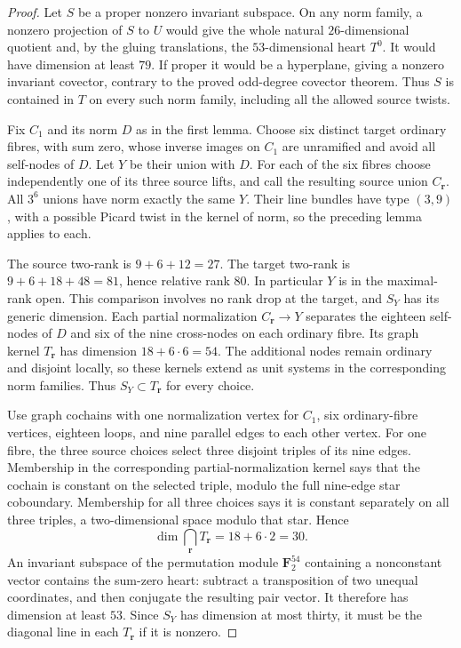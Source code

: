 \begin{proof}
Let $S$ be a proper nonzero invariant subspace. On any norm
family, a nonzero projection of $S$ to $U$ would give the whole
natural $26$-dimensional quotient and, by the gluing translations,
the $53$-dimensional heart $T^0$. It would have dimension at
least $79$. If proper it would be a hyperplane, giving a
nonzero invariant covector, contrary to the proved odd-degree
covector theorem. Thus $S$ is contained in $T$ on every such
norm family, including all the allowed source twists.

Fix $C_1$ and its norm $D$ as in the first lemma. Choose six
distinct target ordinary fibres, with sum zero, whose inverse
images on $C_1$ are unramified and avoid all self-nodes of $D$.
Let $Y$ be their union with $D$. For each of the six fibres
choose independently one of its three source lifts, and call
the resulting source union $C_{\mathbf r}$. All $3^6$ unions
have norm exactly the same $Y$. Their line bundles have type
$(3,9)$, with a possible Picard twist in the kernel of norm,
so the preceding lemma applies to each.

The source two-rank is $9+6+12=27$. The target two-rank is
$9+6+18+48=81$, hence relative rank $80$. In particular $Y$
is in the maximal-rank open. This comparison involves no
rank drop at the target, and $S_Y$ has its generic dimension.
Each partial normalization $C_{\mathbf r}\to Y$ separates
the eighteen self-nodes of $D$ and six of the nine cross-nodes
on each ordinary fibre. Its graph kernel $T_{\mathbf r}$ has
dimension $18+6\cdot6=54$. The additional nodes remain
ordinary and disjoint locally, so these kernels extend as
unit systems in the corresponding norm families. Thus
$S_Y\subset T_{\mathbf r}$ for every choice.

Use graph cochains with one normalization vertex for $C_1$,
six ordinary-fibre vertices, eighteen loops, and nine parallel
edges to each other vertex. For one fibre, the three source
choices select three disjoint triples of its nine edges.
Membership in the corresponding partial-normalization kernel
says that the cochain is constant on the selected triple,
modulo the full nine-edge star coboundary. Membership for all
three choices says it is constant separately on all three
triples, a two-dimensional space modulo that star. Hence
\[
                \dim\bigcap_{\mathbf r}T_{\mathbf r}
                         =18+6\cdot2=30.
\]
An invariant subspace of the permutation module
$\mathbf F_2^{54}$ containing a nonconstant vector contains
the sum-zero heart: subtract a transposition of two unequal
coordinates, and then conjugate the resulting pair vector.
It therefore has dimension at least $53$. Since $S_Y$ has
dimension at most thirty, it must be the diagonal line in
each $T_{\mathbf r}$ if it is nonzero.


\end{proof}
